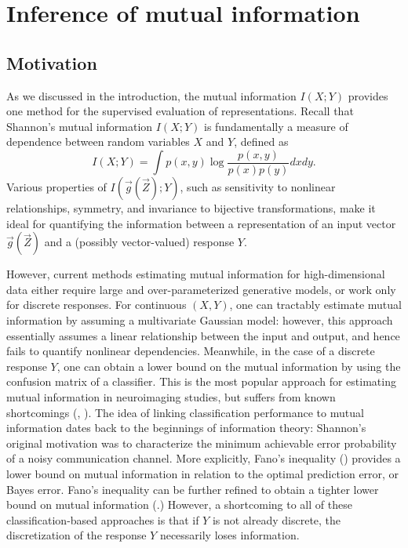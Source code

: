 
\chapter{Inference of mutual information} %

\label{Chapter4} %

\section{Motivation}

As we discussed in the introduction, the mutual information $I(X; Y)$
provides one method for the supervised evaluation of representations.
Recall that Shannon's mutual information $I(X; Y)$ is fundamentally a
measure of dependence between random variables $X$ and $Y$, defined as
\[
I(X;Y) = \int p(x, y) \log \frac{p(x, y)}{p(x)p(y)}dxdy.
\]
Various properties of $I(\vec{g}(\vec{Z}); Y)$, such as sensitivity to
nonlinear relationships, symmetry, and invariance to bijective
transformations, make it ideal for quantifying the information between
a representation of an input vector $\vec{g}(\vec{Z})$ and a (possibly
vector-valued) response $Y$.  

However, current methods estimating mutual information for
high-dimensional data either require large and over-parameterized
generative models, or work only for discrete responses.  For
continuous $(X, Y)$, one can tractably estimate mutual information by
assuming a multivariate Gaussian model: however, this approach
essentially assumes a linear relationship between the input and
output, and hence fails to quantify nonlinear dependencies.
Meanwhile, in the case of a discrete response $Y$, one can obtain a
lower bound on the mutual information by using the confusion matrix of
a classifier.  This is the most popular approach for estimating mutual
information in neuroimaging studies, but suffers from known
shortcomings (\cite{Gastpar2009}, \cite{QuianQuiroga2009}).  The idea
of linking classification performance to mutual information dates back
to the beginnings of information theory: Shannon's original motivation
was to characterize the minimum achievable error probability of a
noisy communication channel.  More explicitly, Fano's inequality
(\cite{fano1961transmission}) provides a lower bound on mutual
information in relation to the optimal prediction error, or Bayes
error.  Fano's inequality can be further refined to obtain a tighter
lower bound on mutual information (\cite{tebbe1968uncertainty}.)
However, a shortcoming to all of these classification-based approaches
is that if $Y$ is not already discrete, the discretization of the
response $Y$ necessarily loses information.

